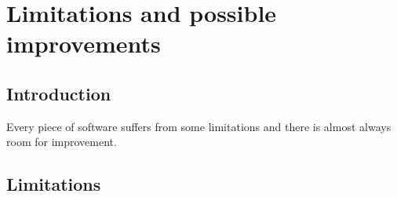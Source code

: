 \section{Limitations and possible improvements}

\label{limitations-improvements}

\subsection{Introduction}

Every piece of software suffers from some limitations and there is almost
always room for improvement.

\subsection{Limitations}

